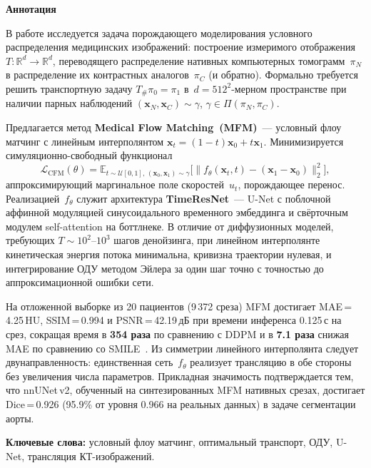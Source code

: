 \begin{center}
    \Large{\textbf{Аннотация}}
\end{center}

\noindent
В работе исследуется задача порождающего моделирования условного распределения медицинских изображений: построение измеримого отображения~$T : \mathbb{R}^d \to \mathbb{R}^d$, переводящего распределение нативных компьютерных томограмм~$\pi_N$ в распределение их контрастных аналогов~$\pi_C$ (и обратно). Формально требуется решить транспортную задачу $T_{\#}\pi_0 = \pi_1$ в~$d=512^2$-мерном пространстве при наличии парных наблюдений $(\mathbf{x}_N,\mathbf{x}_C)\sim\gamma$, $\gamma\in\Pi(\pi_N,\pi_C)$.

Предлагается метод \textbf{Medical Flow Matching~(MFM)}~--- условный флоу матчинг с линейным интерполянтом $\mathbf{x}_t=(1-t)\mathbf{x}_0+t\mathbf{x}_1$. Минимизируется симуляционно-свободный функционал
\[
    \mathcal{L}_{\mathrm{CFM}}(\theta) = \mathbb{E}_{t\sim\mathcal{U}[0,1],\,(\mathbf{x}_0,\mathbf{x}_1)\sim\gamma}\bigl[\lVert f_\theta(\mathbf{x}_t,t)-(\mathbf{x}_1-\mathbf{x}_0)\rVert_2^2\bigr],
\]
аппроксимирующий маргинальное поле скоростей~$u_t$, порождающее перенос. Реализацией~$f_\theta$ служит архитектура \textbf{TimeResNet}~--- U-Net с поблочной аффинной модуляцией синусоидального временного эмбеддинга и свёрточным модулем self-attention на боттлнеке. В отличие от диффузионных моделей, требующих $T\!\sim\!10^2$--$10^3$ шагов денойзинга, при линейном интерполянте кинетическая энергия потока минимальна, кривизна траектории нулевая, и интегрирование ОДУ методом Эйлера за один шаг точно с точностью до аппроксимационной ошибки сети.

На отложенной выборке из 20 пациентов (9\,372 среза) MFM достигает MAE\,=\,4.25\,HU, SSIM\,=\,0.994 и PSNR\,=\,42.19\,дБ при времени инференса 0.125\,с на срез, сокращая время в \textbf{354 раза} по сравнению с DDPM и в \textbf{7.1 раза} снижая MAE по сравнению со SMILE~\cite{liu2025see}. Из симметрии линейного интерполянта следует двунаправленность: единственная сеть~$f_\theta$ реализует трансляцию в обе стороны без увеличения числа параметров. Прикладная значимость подтверждается тем, что nnUNet\,v2, обученный на синтезированных MFM нативных срезах, достигает Dice\,=\,0.926 (95.9\% от уровня 0.966 на реальных данных) в задаче сегментации аорты.

\medskip
\noindent\textbf{Ключевые слова:} условный флоу матчинг, оптимальный транспорт, ОДУ, U-Net, трансляция КТ-изображений.
